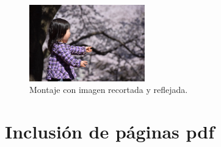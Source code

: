 \documentclass{article}
\begin{document}
\begin{figure}[H]
\centering
\includegraphics[trim = 50mm 0mm 190mm 40mm, clip,width=5cm]{./graficos/sorpresa}
\hspace{-0.35cm}
\caption{Montaje con imagen recortada y reflejada.}
\label{fig:5}
\end{figure}

\section{Inclusión de páginas pdf}

\end{document}
